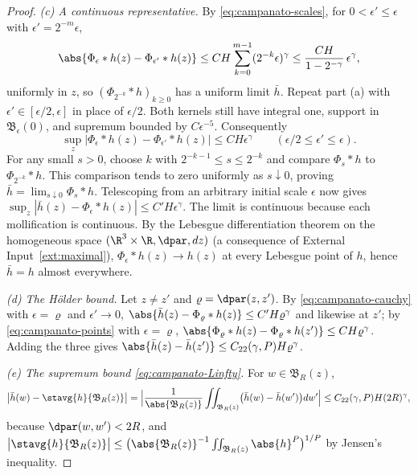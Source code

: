 \documentclass[11pt,reqno]{amsart}
\begin{document}
\begin{proof}
\emph{(c) A continuous representative.} By \eqref{eq:campanato-scales}, for
$0<\epsilon'\le\epsilon$ with $\epsilon'=2^{-m}\epsilon$,
\begin{equation}\label{eq:campanato-cauchy}
  \abs{\Phi_{\epsilon}*h(z)-\Phi_{\epsilon'}*h(z)}
  \le CH\sum_{k=0}^{m-1}(2^{-k}\epsilon)^{\gamma}
  \le\frac{CH}{1-2^{-\gamma}}\,\epsilon^{\gamma},
\end{equation}
uniformly in $z$, so $(\Phi_{2^{-k}}*h)_{k\ge0}$ has a uniform limit
$\bar h$. Repeat part (a) with $\epsilon'\in[\epsilon/2,\epsilon]$
in place of $\epsilon/2$. Both kernels still have integral one,
support in $\mathfrak B_\epsilon(0)$, and supremum bounded by
$C\epsilon^{-5}$. Consequently
\[
 \sup_z|\Phi_\epsilon*h(z)-\Phi_{\epsilon'}*h(z)|
       \le CH\epsilon^\gamma
 \qquad(\epsilon/2\le\epsilon'\le\epsilon).
\]
For any small $s>0$, choose $k$ with $2^{-k-1}\le s\le2^{-k}$
and compare $\Phi_s*h$ to $\Phi_{2^{-k}}*h$. This comparison tends to
zero uniformly as $s\downarrow0$, proving
$\bar h=\lim_{s\downarrow0}\Phi_s*h$. Telescoping from an arbitrary
initial scale $\epsilon$ now gives
$\sup_z|\bar h(z)-\Phi_\epsilon*h(z)|\le C'H\epsilon^\gamma$.
The limit is continuous because each mollification is continuous.
By the Lebesgue differentiation theorem on the homogeneous space
$(\R^{3}\times\R,\dpar,dz)$ (a consequence of
External Input~\ref{ext:maximal}), $\Phi_{\epsilon}*h(z)\to h(z)$ at every
Lebesgue point of $h$, hence $\bar h=h$ almost everywhere.

\emph{(d) The H\"older bound.} Let $z\ne z'$ and $\varrho=\dpar(z,z')$. By
\eqref{eq:campanato-cauchy} with $\epsilon=\varrho$ and $\epsilon'\to0$,
$\abs{\bar h(z)-\Phi_{\varrho}*h(z)}\le C'H\varrho^{\gamma}$ and likewise at
$z'$; by \eqref{eq:campanato-points} with $\epsilon=\varrho$,
$\abs{\Phi_{\varrho}*h(z)-\Phi_{\varrho}*h(z')}\le CH\varrho^{\gamma}$. Adding
the three gives $\abs{\bar h(z)-\bar h(z')}\le C_{22}(\gamma,P)H\varrho^{\gamma}$.

\emph{(e) The supremum bound \eqref{eq:campanato-Linfty}.} For
$w\in\mathfrak{B}_{R}(z)$,
\[
  \bigl|\bar h(w)-\stavg{h}{\mathfrak{B}_{R}(z)}\bigr|
  =\Bigl|\frac1{\abs{\mathfrak{B}_{R}(z)}}\iint_{\mathfrak{B}_{R}(z)}
     \bigl(\bar h(w)-\bar h(w')\bigr)dw'\Bigr|
  \le C_{22}(\gamma,P)H(2R)^{\gamma},
\]
because $\dpar(w,w')<2R$, and
$\bigl|\stavg{h}{\mathfrak{B}_{R}(z)}\bigr|
 \le\bigl(\abs{\mathfrak{B}_{R}(z)}^{-1}\iint_{\mathfrak{B}_{R}(z)}\abs{h}^{P}\bigr)^{1/P}$
by Jensen's inequality.
\end{proof}
\end{document}

